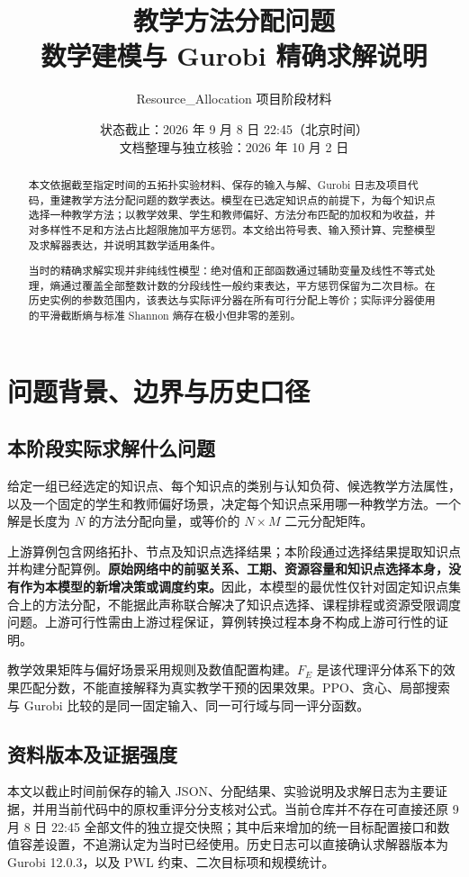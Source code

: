 \documentclass[UTF8,11pt,a4paper,fontset=fandol]{ctexart}
\title{教学方法分配问题\\数学建模与 Gurobi 精确求解说明}
\author{Resource\_Allocation 项目阶段材料}
\date{状态截止：2026 年 9 月 8 日 22:45（北京时间）\\文档整理与独立核验：2026 年 10 月 2 日}
\begin{document}
\maketitle
\begin{abstract}
本文依据截至指定时间的五拓扑实验材料、保存的输入与解、Gurobi 日志及项目代码，重建教学方法分配问题的数学表达。模型在已选定知识点的前提下，为每个知识点选择一种教学方法；以教学效果、学生和教师偏好、方法分布匹配的加权和为收益，并对多样性不足和方法占比超限施加平方惩罚。本文给出符号表、输入预计算、完整模型及求解器表达，并说明其数学适用条件。

当时的精确求解实现并非纯线性模型：绝对值和正部函数通过辅助变量及线性不等式处理，熵通过覆盖全部整数计数的分段线性一般约束表达，平方惩罚保留为二次目标。在历史实例的参数范围内，该表达与实际评分器在所有可行分配上等价；实际评分器使用的平滑截断熵与标准 Shannon 熵存在极小但非零的差别。
\end{abstract}
\tableofcontents
\newpage

\section{问题背景、边界与历史口径}
\subsection{本阶段实际求解什么问题}
给定一组已经选定的知识点、每个知识点的类别与认知负荷、候选教学方法属性，以及一个固定的学生和教师偏好场景，决定每个知识点采用哪一种教学方法。一个解是长度为 $N$ 的方法分配向量，或等价的 $N\times M$ 二元分配矩阵。

上游算例包含网络拓扑、节点及知识点选择结果；本阶段通过选择结果提取知识点并构建分配算例。\textbf{原始网络中的前驱关系、工期、资源容量和知识点选择本身，没有作为本模型的新增决策或调度约束。}因此，本模型的最优性仅针对固定知识点集合上的方法分配，不能据此声称联合解决了知识点选择、课程排程或资源受限调度问题。上游可行性需由上游过程保证，算例转换过程本身不构成上游可行性的证明。

教学效果矩阵与偏好场景采用规则及数值配置构建。$F_E$ 是该代理评分体系下的效果匹配分数，不能直接解释为真实教学干预的因果效果。PPO、贪心、局部搜索与 Gurobi 比较的是同一固定输入、同一可行域与同一评分函数。

\subsection{资料版本及证据强度}
本文以截止时间前保存的输入 JSON、分配结果、实验说明及求解日志为主要证据，并用当前代码中的原权重评分分支核对公式。当前仓库并不存在可直接还原 9 月 8 日 22:45 全部文件的独立提交快照；其中后来增加的统一目标配置接口和数值容差设置，不追溯认定为当时已经使用。历史日志可以直接确认求解器版本为 Gurobi 12.0.3，以及 PWL 约束、二次目标项和规模统计。
\end{document}
